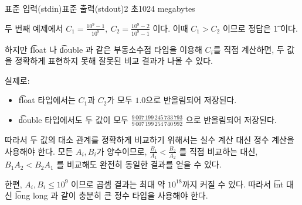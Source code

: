\begin{problem}{\probtitle}{표준 입력(stdin)}{표준 출력(stdout)}{2 초}{1024 megabytes}
\Example

\begin{example}
\end{example}

\Notes

두 번째 예제에서 $C_1 = \frac{10^9-1}{10^9},\ C_2 = \frac{10^9-2}{10^9-1}$ 이다. 이때 $C_1 > C_2$ 이므로 정답은 \t{1} 이다.

하지만 \t{float} 나 \t{double} 과 같은 부동소수점 타입을 이용해 $C_i$를 직접 계산하면, 두 값을 정확하게 표현하지 못해 잘못된 비교 결과가 나올 수 있다.

실제로:
\begin{itemize}[topsep=0pt,noitemsep]
    \item \t{float} 타입에서는 $C_1$과 $C_2$가 모두 $1.0$으로 반올림되어 저장된다.
    \item \t{double} 타입에서도 두 값이 모두
    $\frac{9\,007\,199\,245\,733\,793}{9\,007\,199\,254\,740\,992}$
    으로 반올림되어 저장된다.
\end{itemize}

따라서 두 값의 대소 관계를 정확하게 비교하기 위해서는 실수 계산 대신 정수 계산을 사용해야 한다. 모든 $A_i, B_i$가 양수이므로, $\frac{B_1}{A_1} < \frac{B_2}{A_2}$ 를 직접 비교하는 대신, $B_1A_2 < B_2A_1$ 를 비교해도 완전히 동일한 결과를 얻을 수 있다.

한편, $A_i, B_i \le 10^9$ 이므로 곱셈 결과는 최대 약 $10^{18}$까지 커질 수 있다. 따라서 \t{int} 대신 \t{long long} 과 같이 충분히 큰 정수 타입을 사용해야 한다.


\end{problem}